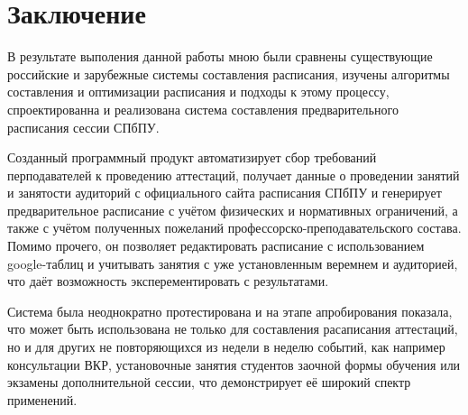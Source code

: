 \chapter*{Заключение} \label{ch-conclusion}

В результате выполения данной работы мною были сравнены существующие российские и зарубежные системы составления расписания, изучены алгоритмы составления и оптимизации расписания и подходы к этому процессу, спроектированна и реализована система составления предварительного расписания сессии СПбПУ. 

Созданный программный продукт автоматизирует сбор требований перподавателей к проведению аттестаций, получает данные о проведении занятий и занятости аудиторий с официального сайта расписания СПбПУ и генерирует предварительное расписание с учётом физических и нормативных ограничений, а также с учётом полученных пожеланий профессорско-преподавательского состава. Помимо прочего, он позволяет редактировать расписание с использованием google-таблиц и учитывать занятия с уже установленным веремнем и аудиторией, что даёт возможность эксперементировать с результатами.

Система была неоднократно протестирована и на этапе апробирования показала, что может быть использована не только для составления расаписания аттестаций, но и для других не повторяющихся из недели в неделю событий, как например консультации ВКР, установочные занятия студентов заочной формы обучения или экзамены дополнительной сессии, что демонстрирует её широкий спектр применений.